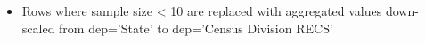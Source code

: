 \begin{itemize}
\item Rows where sample size < 10 are replaced with aggregated values down-scaled from dep='State' to dep='Census Division RECS'
\end{itemize}
